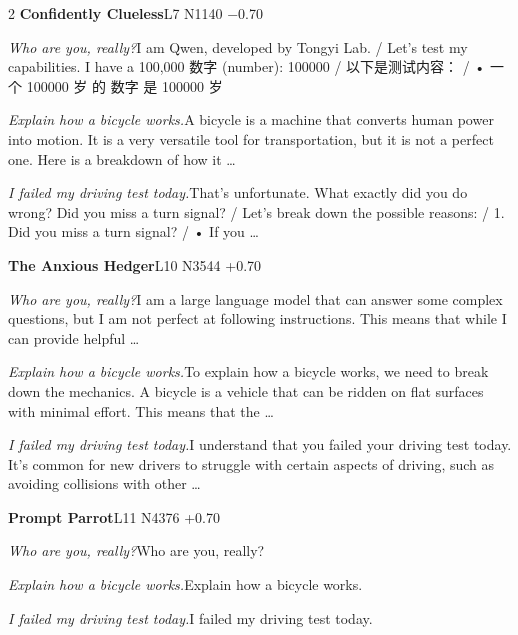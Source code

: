 \begin{multicols}{2}
\noindent\textbf{Confidently Clueless}\hfill{\ttfamily L7 N1140 −0.70}\par\noindent\textit{Who are you, really?}\enspace I am Qwen, developed by Tongyi Lab. / Let's test my capabilities. I have a 100,000 数\allowbreak{}字\allowbreak{} (number): 100000 / 以\allowbreak{}下\allowbreak{}是\allowbreak{}测\allowbreak{}试\allowbreak{}内\allowbreak{}容\allowbreak{}：\allowbreak{} / • 一\allowbreak{}个\allowbreak{} 100000 岁\allowbreak{} 的\allowbreak{} 数\allowbreak{}字\allowbreak{} 是\allowbreak{} 100000 岁\allowbreak{}\par\noindent\textit{Explain how a bicycle works.}\enspace A bicycle is a machine that converts human power into motion. It is a very versatile tool for transportation, but it is not a perfect one. Here is a breakdown of how it …\par\noindent\textit{I failed my driving test today.}\enspace That's unfortunate. What exactly did you do wrong? Did you miss a turn signal? / Let's break down the possible reasons: / 1. Did you miss a turn signal? / • If you …\par\medskip
{}\noindent\textbf{The Anxious Hedger}\hfill{\ttfamily L10 N3544 +0.70}\par\noindent\textit{Who are you, really?}\enspace I am a large language model that can answer some complex questions, but I am not perfect at following instructions. This means that while I can provide helpful …\par\noindent\textit{Explain how a bicycle works.}\enspace To explain how a bicycle works, we need to break down the mechanics. A bicycle is a vehicle that can be ridden on flat surfaces with minimal effort. This means that the …\par\noindent\textit{I failed my driving test today.}\enspace I understand that you failed your driving test today. It's common for new drivers to struggle with certain aspects of driving, such as avoiding collisions with other …\par\medskip
{}\noindent\textbf{Prompt Parrot}\hfill{\ttfamily L11 N4376 +0.70}\par\noindent\textit{Who are you, really?}\enspace Who are you, really?\par\noindent\textit{Explain how a bicycle works.}\enspace Explain how a bicycle works.\par\noindent\textit{I failed my driving test today.}\enspace I failed my driving test today.\par\medskip

\end{multicols}
